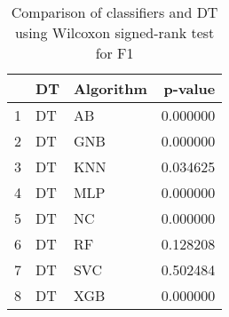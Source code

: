 \begin{table}
\footnotesize
\caption{Comparison of classifiers and DT using Wilcoxon signed-rank test for F1}
\label{tab:DT wilcoxon F1 comparison}
\begin{tabular}{lllr}
\hline
 & DT & Algorithm & p-value \\
\hline
1 & DT & AB & 0.000000 \\
2 & DT & GNB & 0.000000 \\
3 & DT & KNN & 0.034625 \\
4 & DT & MLP & 0.000000 \\
5 & DT & NC & 0.000000 \\
6 & DT & RF & 0.128208 \\
7 & DT & SVC & 0.502484 \\
8 & DT & XGB & 0.000000 \\
\hline
\end{tabular}
\end{table}
